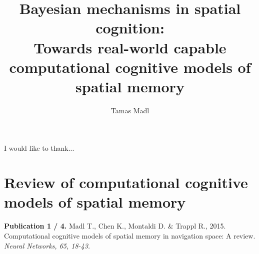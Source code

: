 \documentclass[12pt,PhD,twoside]{muthesis}
\begin{document}

\title{Bayesian mechanisms in spatial cognition:\\
Towards real-world capable computational cognitive models of spatial memory}
\author{Tamas Madl}

\beforeabstract



\afterabstract

I would like to thank...
\afterpreface



 

\chapter{Review of computational cognitive models of spatial memory}
\label{cha:nnreview}

\textbf{Publication 1 / 4.} Madl T., Chen K., Montaldi D. \& Trappl R., 2015. Computational cognitive models of spatial memory in navigation space: A review. \textit{Neural Networks, 65, 18-43.}

\newpage

\addtocounter{page}{-1}


\end{document}
